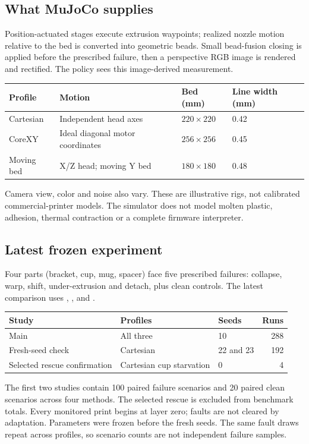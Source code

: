 \documentclass[10pt,letterpaper]{article}
\newcommand{\code}[1]{\texttt{\detokenize{#1}}}
\begin{document}
\subsection*{What MuJoCo supplies}
Position-actuated stages execute extrusion waypoints; realized nozzle motion
relative to the bed is converted into geometric beads. Small bead-fusion closing
is applied before the prescribed failure, then a perspective RGB image is
rendered and rectified. The policy sees this image-derived measurement.

\begin{tabularx}{\linewidth}{@{}lYYY@{}}
\toprule
Profile & Motion & Bed (mm) & Line width (mm)\\
\midrule
Cartesian & Independent head axes & $220\times220$ & 0.42\\
CoreXY & Ideal diagonal motor coordinates & $256\times256$ & 0.45\\
Moving bed & X/Z head; moving Y bed & $180\times180$ & 0.48\\
\bottomrule
\end{tabularx}
Camera view, color and noise also vary. These are illustrative rigs, not calibrated
commercial-printer models. The simulator does not model molten plastic, adhesion,
thermal contraction or a complete firmware interpreter.

\subsection*{Latest frozen experiment}
Four parts (bracket, cup, mug, spacer) face five prescribed failures: collapse,
warp, shift, under-extrusion and detach, plus clean controls. The latest comparison
uses \code{ignore}, \code{ours}, \code{guarded} and \code{contour}.

\begin{tabularx}{\linewidth}{@{}YYYr@{}}
\toprule
Study & Profiles & Seeds & Runs\\
\midrule
Main & All three & 10 & 288\\
Fresh-seed check & Cartesian & 22 and 23 & 192\\
Selected rescue confirmation & Cartesian cup starvation & 0 & 4\\
\bottomrule
\end{tabularx}
The first two studies contain 100 paired failure scenarios and 20 paired clean
scenarios across four methods. The selected rescue is excluded from benchmark
totals. Every monitored print begins at layer zero; faults are not cleared by
adaptation. Parameters were frozen before the fresh seeds. The same fault draws
repeat across profiles, so scenario counts are not independent failure samples.
\end{document}
